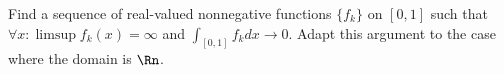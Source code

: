 Find a sequence of real-valued nonnegative functions $\{f_k\}$ on
$[0,1]$ such that $\forall x: \limsup f_k(x)=\infty$ and
$\int_{[0,1]}f_kdx\rightarrow 0$. Adapt this argument to the case
where the domain is $\Rn$.
